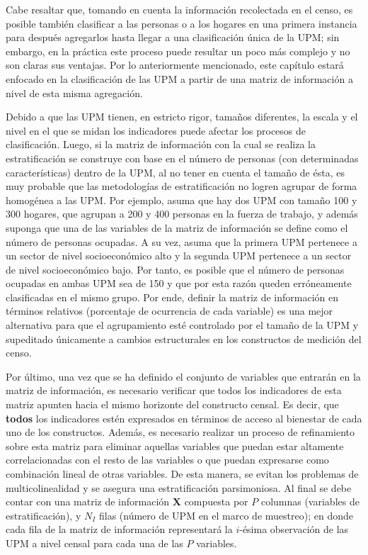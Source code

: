 \documentclass[
  12pt,
]{book}
\begin{document}
Cabe resaltar que, tomando en cuenta la información recolectada en el censo, es posible también clasificar a las personas o a los hogares en una primera instancia para después agregarlos hasta llegar a una clasificación única de la UPM; sin embargo, en la práctica este proceso puede resultar un poco más complejo y no son claras sus ventajas. Por lo anteriormente mencionado, este capítulo estará enfocado en la clasificación de las UPM a partir de una matriz de información a nivel de esta misma agregación.

Debido a que las UPM tienen, en estricto rigor, tamaños diferentes, la escala y el nivel en el que se midan los indicadores puede afectar los procesos de clasificación. Luego, si la matriz de información con la cual se realiza la estratificación se construye con base en el número de personas (con determinadas características) dentro de la UPM, al no tener en cuenta el tamaño de ésta, es muy probable que las metodologías de estratificación no logren agrupar de forma homogénea a las UPM. Por ejemplo, asuma que hay dos UPM con tamaño 100 y 300 hogares, que agrupan a 200 y 400 personas en la fuerza de trabajo, y además suponga que una de las variables de la matriz de información se define como el número de personas ocupadas. A su vez, asuma que la primera UPM pertenece a un sector de nivel socioeconómico alto y la segunda UPM pertenece a un sector de nivel socioeconómico bajo. Por tanto, es posible que el número de personas ocupadas en ambas UPM sea de 150 y que por esta razón queden erróneamente clasificadas en el mismo grupo. Por ende, definir la matriz de información en términos relativos (porcentaje de ocurrencia de cada variable) es una mejor alternativa para que el agrupamiento esté controlado por el tamaño de la UPM y supeditado únicamente a cambios estructurales en los constructos de medición del censo.

Por último, una vez que se ha definido el conjunto de variables que entrarán en la matriz de información, es necesario verificar que todos los indicadores de esta matriz apunten hacia el mismo horizonte del constructo censal. Es decir, que \textbf{todos} los indicadores estén expresados en términos de acceso al bienestar de cada uno de los constructos. Además, es necesario realizar un proceso de refinamiento sobre esta matriz para eliminar aquellas variables que puedan estar altamente correlacionadas con el resto de las variables o que puedan expresarse como combinación lineal de otras variables. De esta manera, se evitan los problemas de multicolinealidad y se asegura una estratificación parsimoniosa. Al final se debe contar con una matriz de información \(\mathbf{X}\) compuesta por \(P\) columnas (variables de estratificación), y \(N_I\) filas (número de UPM en el marco de muestreo); en donde cada fila de la matriz de información representará la \(i\)-ésima observación de las UPM a nivel censal para cada una de las \(P\) variables.
\end{document}

